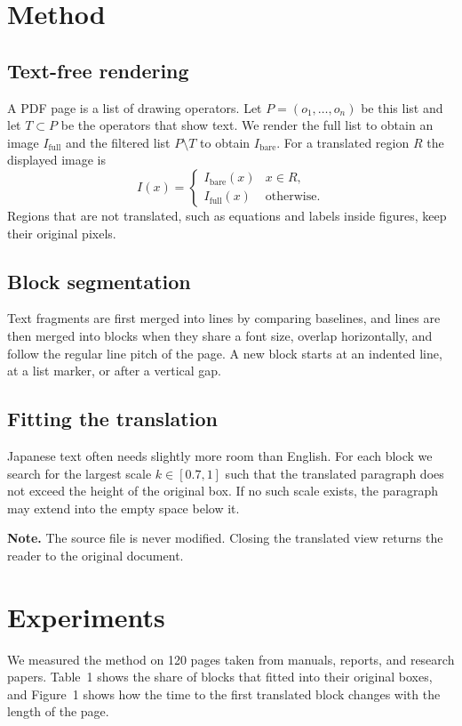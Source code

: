\documentclass[10pt,twocolumn]{article}
\begin{document}
\section{Method}
\subsection{Text-free rendering}
A PDF page is a list of drawing operators. Let $P = (o_1, \dots, o_n)$ be this list and
let $T \subset P$ be the operators that show text. We render the full list to obtain an
image $I_{\mathrm{full}}$ and the filtered list $P \setminus T$ to obtain
$I_{\mathrm{bare}}$. For a translated region $R$ the displayed image is
\begin{equation}
I(x) =
\begin{cases}
I_{\mathrm{bare}}(x) & x \in R,\\
I_{\mathrm{full}}(x) & \text{otherwise.}
\end{cases}
\end{equation}
Regions that are not translated, such as equations and labels inside figures, keep
their original pixels.

\subsection{Block segmentation}
Text fragments are first merged into lines by comparing baselines, and lines are then
merged into blocks when they share a font size, overlap horizontally, and follow the
regular line pitch of the page. A new block starts at an indented line, at a list
marker, or after a vertical gap.

\subsection{Fitting the translation}
Japanese text often needs slightly more room than English. For each block we search
for the largest scale $k \in [0.7, 1]$ such that the translated paragraph does not
exceed the height of the original box. If no such scale exists, the paragraph may
extend into the empty space below it.

\medskip
\noindent\colorbox{black!82}{\parbox{\dimexpr\columnwidth-2\fboxsep}{\color{white}\small
\textbf{Note.} The source file is never modified. Closing the translated view returns
the reader to the original document.}}

\section{Experiments}
We measured the method on 120 pages taken from manuals, reports, and research papers.
Table~1 shows the share of blocks that fitted into their original boxes, and Figure~1
shows how the time to the first translated block changes with the length of the page.
\end{document}
